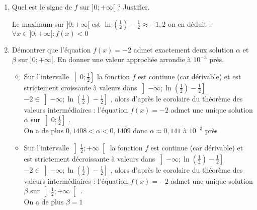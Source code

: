 \documentclass{cornouaille}
\begin{document}
\begin{exercice}[Logarithmes][7]
\begin{enumerate}
\begin{solution}
\end{solution}
	\item Quel est le signe de $f$ sur $]0;+\infty[$ ? Justifier.\\
	\ldotcarreaux[2]
\begin{solution}
Le maximum sur $]0;+\infty[$ est $\ln\left(\frac{1}{2}\right)-\frac{1}{2} \approx -1,2$ 
on en déduit : $\forall x \in ]0;+\infty[ : f(x) <0$ 
\end{solution}
	\item Démontrer que l'équation $f(x)=-2$ admet exactement deux solution $\alpha$ et $\beta$ sur $]0;+\infty[$. En donner une valeur approchée arrondie à $10^{-3}$ près.\\
	\ldotcarreaux[6]
\begin{solution}
\begin{itemize}
	\item Sur l'intervalle $\left] 0; \frac{1}{2}\right ]$ la fonction $f$ est continue (car dérivable) et est strictement croissante à valeurs dans $\left]-\infty;\ln\left(\frac{1}{2}\right)-\frac{1}{2} \right]$ \\
	$-2 \in \left]-\infty; \ln(\frac{1}{2})-\frac{1}{2} \right]$ , alors d'après le corolaire du théorème des valeurs intermédiaires : l'équation $f(x)=-2$ admet une unique solution $\alpha$ sur $\left]0;\frac{1}{2} \right]$ .\\
	On a de plus $0,1408 <\alpha <0,1409 $ donc $\alpha \approx 0,141$ à $10^{-3}$ près 
	\item Sur l'intervalle $\left] \frac{1}{2}; +\infty \right[ $ la fonction $f$ est continue (car dérivable) et est strictement décroissante à valeurs dans $\left]-\infty; \ln(\frac{1}{2})-\frac{1}{2} \right]$ \\
	$-2 \in \left]-\infty; \ln(\frac{1}{2})-\frac{1}{2} \right]$  , alors d'après le corolaire du théorème des valeurs intermédiaires : l'équation $f(x)=-2$ admet une unique solution $\beta$ sur  $\left] \frac{1}{2}; +\infty \right[ $ . \\
	On a de plus $\beta =1$
\end{itemize}
\end{solution}
\end{enumerate}
\end{exercice}
\end{document}
